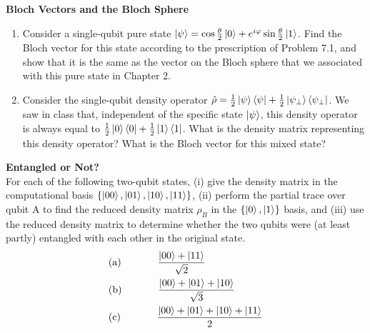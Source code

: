 \documentclass[12pt,letterpaper,boxed,cm]{hmcpset}
\begin{document}
\begin{solution}
    \vfill
\end{solution}
\newpage

\begin{problem}[2.]
    \textbf{Bloch Vectors and the Bloch Sphere}
    \begin{enumerate}[label=(\alph*)]
        \item Consider a single-qubit pure state $\ket{\psi} = \cos \frac{\theta}{2} \ket{0} + e^{i\varphi}\sin \frac{\theta}{2}\ket{1}$.  Find the Bloch vector for this state according to the prescription of Problem 7.1, and show that it is the same as the vector on the Bloch sphere that we associated with this pure state in Chapter 2.
        \item Consider the single-qubit density operator $\hat{\rho} = \frac{1}{2}\ket{\psi}\bra{\psi} + \frac{1}{2}\ket{\psi_{\perp}}\bra{\psi_{\perp}}$.  We saw in class that, independent of the specific state $\ket{\psi}$, this density operator is always equal to $\frac{1}{2}\ket{0}\bra{0}+\frac{1}{2}\ket{1}\bra{1}$.  What is the density matrix representing this density operator?  What is the Bloch vector for this mixed state?
    \end{enumerate} 
\end{problem}

\begin{solution}
    \vfill
\end{solution}
\newpage

\headerblock
{}

\begin{problem}[3.]
    \textbf{Entangled or Not?}\\
    For each of the following two-qubit states, (i) give the density matrix in the computational basis $\{\ket{00},\ket{01},\ket{10},\ket{11}\}$, (ii) perform the partial trace over qubit A to find the reduced density matrix $\rho_B$ in the $\{\ket{0},\ket{1}\}$ basis, and (iii) use the reduced density matrix to determine whether the two qubits were (at least partly) entangled with each other in the original state.
    \begin{align}
        &\mbox{(a)\hspace{0.5in}} \frac{\ket{00}+\ket{11}}{\sqrt{2}} \nonumber \\
        &\mbox{(b)\hspace{0.5in}} \frac{\ket{00}+\ket{01}+\ket{10}}{\sqrt{3}} \nonumber \\
        &\mbox{(c)\hspace{0.5in}} \frac{\ket{00}+\ket{01}+\ket{10}+\ket{11}}{2} \nonumber
    \end{align}
\end{problem}
\end{document}
